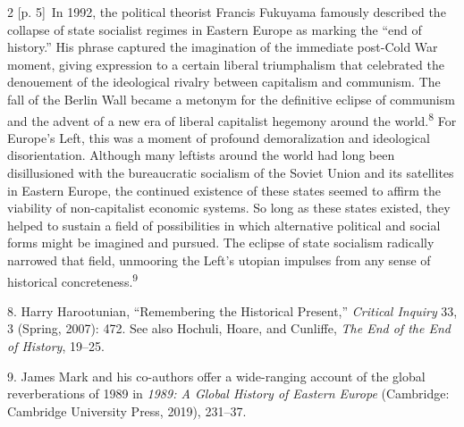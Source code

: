 \documentclass[10pt,a4paper]{article}
\begin{document}
\begin{paracol}{2}
{\scriptsize\color{gray} [p. 5]}\ In 1992, the political theorist Francis Fukuyama famously described the collapse of state socialist regimes in Eastern Europe as marking the “end of history.” His phrase captured the imagination of the immediate post-Cold War moment, giving expression to a certain liberal triumphalism that celebrated the denouement of the ideological rivalry between capitalism and communism. The fall of the Berlin Wall became a metonym for the definitive eclipse of communism and the advent of a new era of liberal capitalist hegemony around the world.\nobreak\textsuperscript{8} For Europe’s Left, this was a moment of profound demoralization and ideological disorientation. Although many leftists around the world had long been disillusioned with the bureaucratic socialism of the Soviet Union and its satellites in Eastern Europe, the continued existence of these states seemed to affirm the viability of non-capitalist economic systems. So long as these states existed, they helped to sustain a field of possibilities in which alternative political and social forms might be imagined and pursued. The eclipse of state socialism radically narrowed that field, unmooring the Left’s utopian impulses from any sense of historical concreteness.\nobreak\textsuperscript{9}\par{\small 8. Harry Harootunian, “Remembering the Historical Present,” \textit{Critical Inquiry} 33, 3 (Spring, 2007): 472. See also Hochuli, Hoare, and Cunliffe, \textit{The End of the End of History}, 19–25.\par}{\small 9. James Mark and his co-authors offer a wide-ranging account of the global reverberations of 1989 in \textit{1989: A Global History of Eastern Europe} (Cambridge: Cambridge University Press, 2019), 231–37.\par}
\switchcolumn*

\end{paracol}
\end{document}
